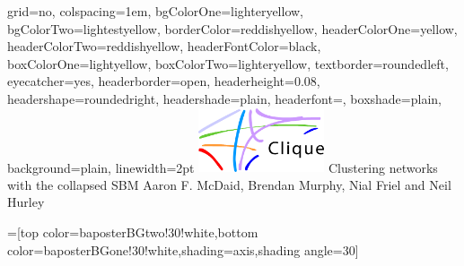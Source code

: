 \documentclass[portrait,final,a0paper]{baposter}
\begin{document}
\newlength{\leftimgwidth}
\begin{poster}%
  {
  grid=no,
  colspacing=1em,
  bgColorOne=lighteryellow,
  bgColorTwo=lightestyellow,
  borderColor=reddishyellow,
  headerColorOne=yellow,
  headerColorTwo=reddishyellow,
  headerFontColor=black,
  boxColorOne=lightyellow,
  boxColorTwo=lighteryellow,
  textborder=roundedleft,
  eyecatcher=yes,
  headerborder=open,
  headerheight=0.08\textheight,
  headershape=roundedright,
  headershade=plain,
  headerfont=\Large\textsf, %
  boxshade=plain,
  background=plain,
  linewidth=2pt
  }
  {\includegraphics[width=10em]{clique}} %
  {\sf %
  Clustering networks with the collapsed SBM}
  {\sf %
  Aaron F. McDaid, Brendan Murphy, Nial Friel and Neil Hurley
  }
  {%
  }

  =[top color=baposterBGtwo!30!white,bottom color=baposterBGone!30!white,shading=axis,shading angle=30]

     \setlength{\leftimgwidth}{0.78em+8.0em}


\end{poster}
\end{document}
